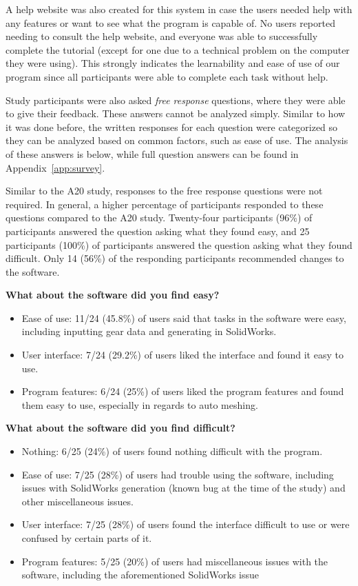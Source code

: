 \begin{doublespace}
A help website was also created for this system in case the users needed help with any features or want to see what the program is capable of. No users reported needing to consult the help website, and everyone was able to successfully complete the tutorial (except for one due to a technical problem on the computer they were using). This strongly indicates the learnability and ease of use of our program since all participants were able to complete each task without help.

Study participants were also asked \emph{free response} questions, where they were able to give their feedback. These answers cannot be analyzed simply. Similar to how it was done before, the written responses for each question were categorized so they can be analyzed based on common factors, such as ease of use. The analysis of these answers is below, while full question answers can be found in Appendix~\ref{app:survey}.

Similar to the A20 study, responses to the free response questions were not required. In general, a higher percentage of participants responded to these questions compared to the A20 study. Twenty-four participants (96\%) of participants answered the question asking what they found easy, and 25 participants (100\%) of participants answered the question asking what they found difficult. Only 14 (56\%) of the responding participants recommended changes to the software.

\begin{singlespace}
\textbf{What about the software did you find easy?}
\begin{itemize}
    \item Ease of use: 11/24 (45.8\%) of users said that tasks in the software were easy, including inputting gear data and generating in SolidWorks.
    \item User interface: 7/24 (29.2\%) of users liked the interface and found it easy to use.
    \item Program features: 6/24 (25\%) of users liked the program features and found them easy to use, especially in regards to auto meshing.
\end{itemize}

\textbf{What about the software did you find difficult?}
\begin{itemize}
    \item Nothing: 6/25 (24\%) of users found nothing difficult with the program.
    \item Ease of use: 7/25 (28\%) of users had trouble using the software, including issues with SolidWorks generation (known bug at the time of the study) and other miscellaneous issues.
    \item User interface: 7/25 (28\%) of users found the interface difficult to use or were confused by certain parts of it.
    \item Program features: 5/25 (20\%) of users had miscellaneous issues with the software, including the aforementioned SolidWorks issue
\end{itemize}


\end{singlespace}
\end{doublespace}
